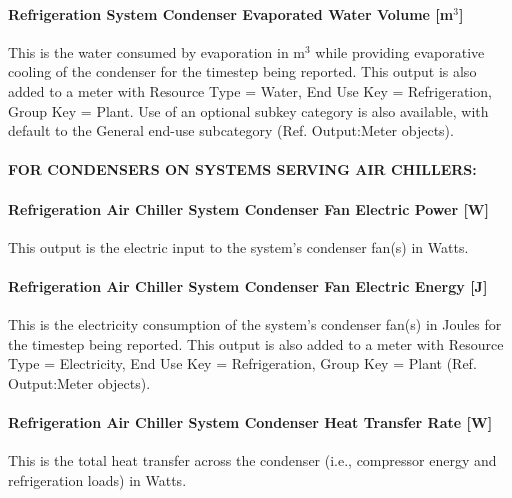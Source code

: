 \paragraph{Refrigeration System Condenser Evaporated Water Volume {[}m\(^{3}\){]}}\label{refrigeration-system-condenser-evaporated-water-volume-m3}

This is the water consumed by evaporation in m\(^{3}\) while providing evaporative cooling of the condenser for the timestep being reported. This output is also added to a meter with Resource Type = Water, End Use Key = Refrigeration, Group Key = Plant. Use of an optional subkey category is also available, with default to the General end-use subcategory (Ref. Output:Meter objects).

\paragraph{FOR CONDENSERS ON SYSTEMS SERVING AIR CHILLERS:}\label{for-condensers-on-systems-serving-air-chillers-1}

\paragraph{Refrigeration Air Chiller System Condenser Fan Electric Power {[}W{]}}\label{refrigeration-air-chiller-system-condenser-fan-electric-power-w-1}

This output is the electric input to the system's condenser fan(s) in Watts.

\paragraph{Refrigeration Air Chiller System Condenser Fan Electric Energy {[}J{]}}\label{refrigeration-air-chiller-system-condenser-fan-electric-energy-j-1}

This is the electricity consumption of the system's condenser fan(s) in Joules for the timestep being reported. This output is also added to a meter with Resource Type = Electricity, End Use Key = Refrigeration, Group Key = Plant (Ref. Output:Meter objects).

\paragraph{Refrigeration Air Chiller System Condenser Heat Transfer Rate {[}W{]}}\label{refrigeration-air-chiller-system-condenser-heat-transfer-rate-w-1}

This is the total heat transfer across the condenser (i.e., compressor energy and refrigeration loads) in Watts.

